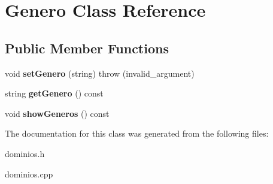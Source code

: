 \hypertarget{classGenero}{}\section{Genero Class Reference}
\label{classGenero}
\subsection*{Public Member Functions}
\begin{DoxyCompactItemize}
\item 
\mbox{\label{classGenero_adc53f59f5147fb37da8782378cffda9c}} 
void {\bfseries set\+Genero} (string)  throw (invalid\+\_\+argument)
\item 
\mbox{\label{classGenero_aa2a093d178f71b41a07b2b497494e7b4}} 
string {\bfseries get\+Genero} () const
\item 
\mbox{\label{classGenero_a1f7c047f6d2c5b75520673a5c3cca6a6}} 
void {\bfseries show\+Generos} () const
\end{DoxyCompactItemize}


The documentation for this class was generated from the following files\+:\begin{DoxyCompactItemize}
\item 
dominios.\+h\item 
dominios.\+cpp\end{DoxyCompactItemize}
